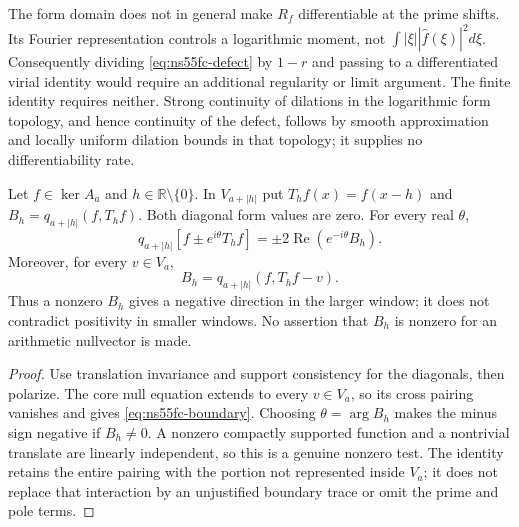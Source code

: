 The form domain does not in general make $R_f$ differentiable at the
prime shifts. Its Fourier representation controls a logarithmic moment,
not $\int|\xi||\widehat f(\xi)|^2d\xi$. Consequently dividing
\eqref{eq:ns55fc-defect} by $1-r$ and passing to a differentiated
virial identity would require an additional regularity or limit
argument. The finite identity requires neither. Strong continuity of
dilations in the logarithmic form topology, and hence continuity of
the defect, follows by smooth approximation and locally uniform
dilation bounds in that topology; it supplies no differentiability rate.

\begin{proposition}\label{prop:ns55fc-translates}
Let $f\in\ker A_a$ and $h\in\mathbb R\setminus\{0\}$.
In $V_{a+|h|}$ put
$T_hf(x)=f(x-h)$ and $B_h=q_{a+|h|}(f,T_hf)$.
Both diagonal form values are zero. For every real $\theta$,
\begin{equation}\label{eq:ns55fc-translation}
 q_{a+|h|}[f\mathbin{\pm}e^{i\theta}T_hf]
          =\mathbin{\pm}2\operatorname{Re}(e^{-i\theta}B_h).
\end{equation}
Moreover, for every $v\in V_a$,
\begin{equation}\label{eq:ns55fc-boundary}
 B_h=q_{a+|h|}(f,T_hf-v).
\end{equation}
Thus a nonzero $B_h$ gives a negative direction in the larger window;
it does not contradict positivity in smaller windows. No assertion
that $B_h$ is nonzero for an arithmetic nullvector is made.
\end{proposition}
\begin{proof}
Use translation invariance and support consistency for the diagonals,
then polarize. The core null equation extends to every $v\in V_a$,
so its cross pairing vanishes and gives \eqref{eq:ns55fc-boundary}.
Choosing $\theta=\arg B_h$ makes the minus sign negative if $B_h\ne0$.
A nonzero compactly supported function and a nontrivial translate are
linearly independent, so this is a genuine nonzero test. The identity
retains the entire pairing with the portion not represented inside
$V_a$; it does not replace that interaction by an unjustified boundary
trace or omit the prime and pole terms.
\end{proof}

